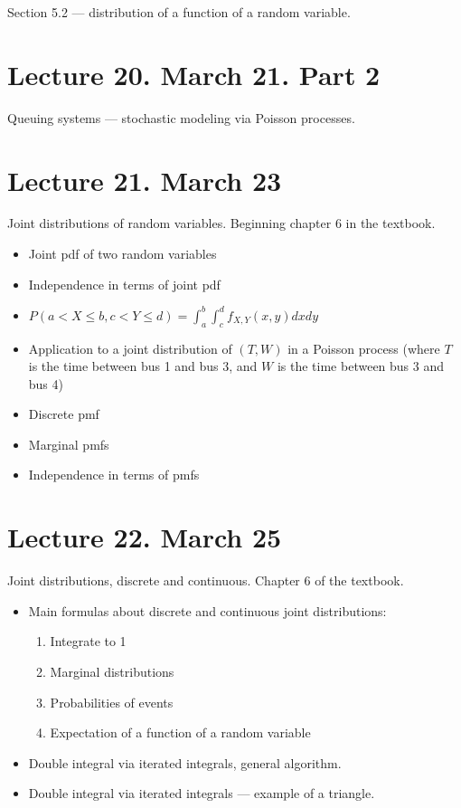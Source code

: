 \documentclass[letterpaper,11pt,oneside,reqno]{amsart}
\numberwithin{equation}{section}
\theoremstyle{definition}
\begin{document}
Section 5.2 --- distribution of a function of a random variable.

\section*{Lecture 20. March 21. Part 2}

Queuing systems --- stochastic modeling via Poisson processes.

\section*{Lecture 21. March 23}

Joint distributions of random variables. 
Beginning chapter 6 in the textbook.
\begin{itemize}
	\item Joint pdf of two random variables
	\item Independence in terms of joint pdf
	\item $P(a<X\le b,c<Y\le d)=\int_a^b\int_c^d f_{X,Y}(x,y)dx dy$
	\item Application to a joint distribution of $(T,W)$ in a Poisson process
		(where $T$ is the time between bus 1 and bus 3, 
		and $W$ is the time between bus 3 and bus 4)
	\item Discrete pmf
	\item Marginal pmfs
	\item Independence in terms of pmfs
\end{itemize}

\section*{Lecture 22. March 25}

Joint distributions, discrete and continuous. Chapter 6 of the textbook. 
\begin{itemize}
	\item Main formulas about discrete and continuous joint distributions:
		\begin{enumerate}
			\item Integrate to 1
			\item Marginal distributions
			\item Probabilities of events
			\item Expectation of a function of a random variable
		\end{enumerate}
	\item Double integral via iterated integrals, general algorithm. 
	\item Double integral via iterated integrals --- example of a triangle.
\end{itemize}
\end{document}
